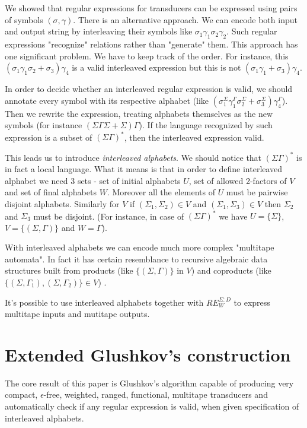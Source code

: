 \documentclass[journal]{journal}
\begin{document}
We showed that regular expressions for transducers can be expressed using pairs of symbols $(\sigma,\gamma)$. There is an alternative approach. We can encode both input and output string by interleaving their symbols like $\sigma_1\gamma_1\sigma_2\gamma_2$. Such regular expressions "recognize" relations rather than "generate" them. This approach has one significant problem. We have to keep track of the order. For instance, this $(\sigma_1\gamma_1\sigma_2 + \sigma_3)\gamma_4$ is a valid interleaved expression but this is not $(\sigma_1\gamma_1 + \sigma_3)\gamma_4$.

In order to decide whether an interleaved regular expression is valid, we should annotate every symbol with its respective alphabet (like $(\sigma_1^\Sigma\gamma_1^\Gamma\sigma_2^\Sigma + \sigma_3^\Sigma)\gamma_4^\Gamma$). Then we rewrite the expression, treating alphabets themselves as the new symbols (for instance $(\Sigma\Gamma\Sigma + \Sigma)\Gamma$). If the language recognized by such expression is a subset of $(\Sigma\Gamma)^*$, then the interleaved expression valid. 

This leads us to introduce \textit{interleaved alphabets}. We should notice that $(\Sigma\Gamma)^*$ is in fact a local language. What it means is that in order to define interleaved alphabet we need 3 sets - set of initial alphabets $U$, set of allowed 2-factors of $V$ and set of final alphabets $W$. Moreover all the elements of $U$ must be pairwise disjoint alphabets. Similarly for $V$ if $(\Sigma_1,\Sigma_2)\in V$ and $(\Sigma_1,\Sigma_3)\in V$  then $\Sigma_2$ and $\Sigma_3$ must be disjoint. (For instance, in case of $(\Sigma\Gamma)^*$  we have $U=\{\Sigma\}$, $V=\{(\Sigma,\Gamma)\}$ and $W=\Gamma$). 

With interleaved alphabets we can encode much more complex "multitape automata". In fact it has certain resemblance to recursive algebraic data structures built from products (like $\{(\Sigma,\Gamma)\}$ in $V$) and coproducts (like $\{(\Sigma,\Gamma_1),(\Sigma,\Gamma_2)\}\in V$) .

It's possible to use interleaved alphabets together with $RE_W^{\Sigma:D}$ to express multitape inputs and mutitape outputs.


\section{Extended Glushkov's construction}

The core result of this paper is Glushkov's algorithm capable of producing very compact, $\epsilon$-free, weighted, ranged, functional, multitape transducers and automatically check if any regular expression is valid, when given specification of interleaved alphabets.
\end{document}

